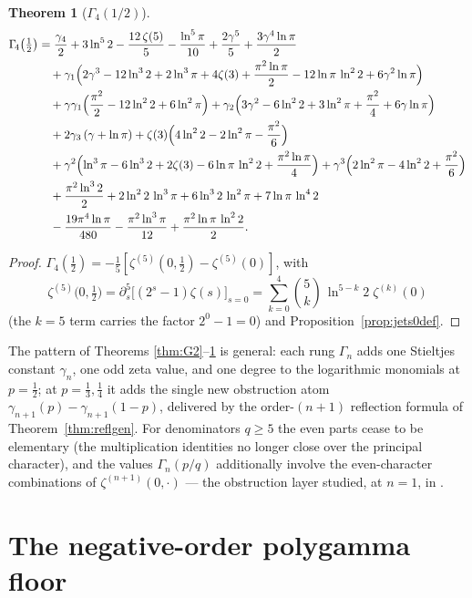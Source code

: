 \documentclass[11pt]{article}
\newtheorem{theorem}{Theorem}[section]
\theoremstyle{remark}
\begin{document}
\begin{theorem}[$\Gamma_{\!4}(1/2)$]\label{thm:G4}
\begin{align*}
\Gamma_{\!4}\bigl(\tfrac12\bigr)
&=\frac{\gamma_4}{2}+3\ln^5 2-\frac{12\,\zeta(5)}{5}-\frac{\ln^5\pi}{10}
+\frac{2\gamma^5}{5}+\frac{3\gamma^4\ln\pi}{2}\\
&\quad+\gamma_1\Bigl(2\gamma^3-12\ln^3 2+2\ln^3\pi+4\zeta(3)
+\frac{\pi^2\ln\pi}{2}-12\ln\pi\,\ln^2 2+6\gamma^2\ln\pi\Bigr)\\
&\quad+\gamma\gamma_1\Bigl(\frac{\pi^2}{2}-12\ln^2 2+6\ln^2\pi\Bigr)
+\gamma_2\Bigl(3\gamma^2-6\ln^2 2+3\ln^2\pi+\frac{\pi^2}{4}+6\gamma\ln\pi\Bigr)\\
&\quad+2\gamma_3\,(\gamma+\ln\pi)
+\zeta(3)\Bigl(4\ln^2 2-2\ln^2\pi-\frac{\pi^2}{6}\Bigr)\\
&\quad+\gamma^2\Bigl(\ln^3\pi-6\ln^3 2+2\zeta(3)-6\ln\pi\,\ln^2 2
+\frac{\pi^2\ln\pi}{4}\Bigr)
+\gamma^3\Bigl(2\ln^2\pi-4\ln^2 2+\frac{\pi^2}{6}\Bigr)\\
&\quad+\frac{\pi^2\ln^3 2}{2}+2\ln^2 2\,\ln^3\pi+6\ln^3 2\,\ln^2\pi
+7\ln\pi\,\ln^4 2\\
&\quad-\frac{19\pi^4\ln\pi}{480}-\frac{\pi^2\ln^3\pi}{12}
+\frac{\pi^2\ln\pi\,\ln^2 2}{2}.
\end{align*}
\end{theorem}

\begin{proof}
$\Gamma_{\!4}(\tfrac12)=-\tfrac15[\zeta^{(5)}(0,\tfrac12)-\zeta^{(5)}(0)]$, with
\[
\zeta^{(5)}\bigl(0,\tfrac12\bigr)=\partial_s^5\bigl[(2^s-1)\zeta(s)\bigr]_{s=0}
=\sum_{k=0}^{4}\binom5k\,\ln^{5-k}2\;\zeta^{(k)}(0)
\]
(the $k=5$ term carries the factor $2^0-1=0$) and
Proposition~\ref{prop:jets0def}.
\end{proof}

The pattern of Theorems \ref{thm:G2}--\ref{thm:G4} is general: each rung
$\Gamma_{\!n}$ adds one Stieltjes constant $\gamma_n$, one odd zeta value,
and one degree to the logarithmic monomials at $p=\tfrac12$; at
$p=\tfrac13,\tfrac14$ it adds the single new obstruction atom
$\gamma_{n+1}(p)-\gamma_{n+1}(1-p)$, delivered by the order-$(n+1)$
reflection formula of Theorem~\ref{thm:reflgen}. For denominators $q\ge5$
the even parts cease to be elementary (the multiplication identities no
longer close over the principal character), and the values
$\Gamma_{\!n}(p/q)$ additionally involve the even-character combinations of
$\zeta^{(n+1)}(0,\cdot)$ — the obstruction layer studied, at $n=1$, in
\cite{BlagouchineJNT}.

\section{The negative-order polygamma floor}\label{sec:negapoly}
\end{document}
